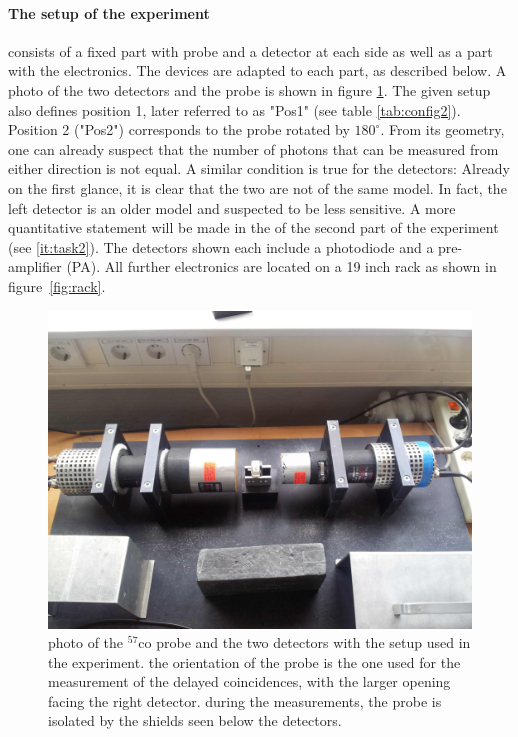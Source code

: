 \paragraph{The setup of the experiment}
consists of a fixed part with probe and a detector at each side 
as well as a part with the electronics. The devices are adapted to each part, as described below. 
A photo of the two detectors and the probe is shown in figure \ref{fig:position_1}. The given setup also 
defines position 1, later referred to as "Pos1" (see table \ref{tab:config2}). Position 2 ("Pos2") corresponds 
to the probe rotated by $180^\circ$. From its geometry, one can already suspect that the number of photons 
that can be measured from either direction is not equal. A similar condition is true for the detectors:
Already on the first glance, it is clear that the two are not of the same model. In fact, the left detector 
is an older model and suspected to be less sensitive. A more quantitative statement will be made in the 
of the second part of the experiment (see \ref{it:task2}). The detectors shown each include a photodiode 
and a pre-amplifier (PA). 
All further electronics are located on a 19 inch rack as shown in figure~\ref{fig:rack}.

\begin{figure}[h]
    \centering
    \includegraphics[width=0.8\linewidth]{figures/position_1.jpg}
    \caption{
        photo of the $^{57}$co probe and the two detectors with the setup used in the 
        experiment. the orientation of the probe is the one used for the measurement of 
        the delayed coincidences, with the larger opening facing the right detector. 
        during the measurements, the probe is isolated by the shields seen below the detectors.
        }
    \label{fig:position_1}
\end{figure}

